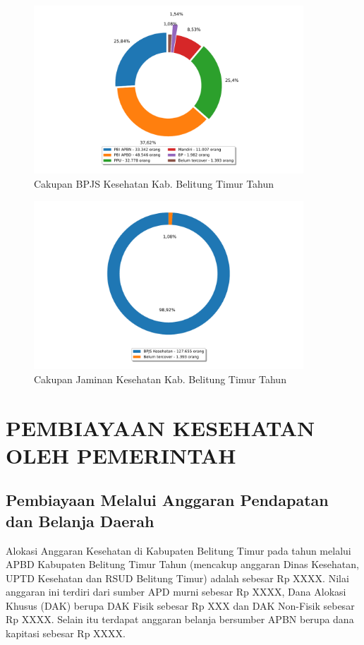 \begin{figure}[H]
    \centering{}
    \includegraphics[width=0.9\textwidth]{bab_04/bab_04_01_jaminanKesehatan_a}
    \caption{Cakupan BPJS Kesehatan Kab. Belitung Timur Tahun \tP}
    \label{fig:Cakupan-BPJS}
\end{figure}

\begin{figure}[H]
    \centering{}
    \includegraphics[width=0.9\textwidth]{bab_04/bab_04_01_jaminanKesehatan_b}
    \caption{Cakupan Jaminan Kesehatan Kab. Belitung Timur Tahun \tP}
    \label{fig:Cakupan-Jamkes}
\end{figure}

\section[PEMBIAYAAN OLEH PEMERINTAH]{PEMBIAYAAN KESEHATAN OLEH PEMERINTAH}
\subsection{Pembiayaan Melalui Anggaran Pendapatan dan Belanja Daerah}
Alokasi Anggaran Kesehatan di Kabupaten Belitung Timur pada tahun \tP melalui APBD Kabupaten Belitung Timur Tahun \tP (mencakup anggaran Dinas Kesehatan, UPTD Kesehatan dan RSUD Belitung Timur) adalah sebesar Rp XXXX. Nilai anggaran ini terdiri dari sumber APD murni sebesar Rp XXXX, Dana Alokasi Khusus (DAK) berupa DAK Fisik sebesar Rp XXX dan DAK Non-Fisik sebesar Rp XXXX. Selain itu terdapat anggaran belanja bersumber APBN berupa dana kapitasi sebesar Rp XXXX.

